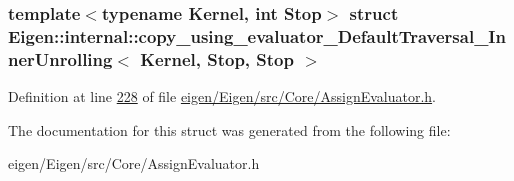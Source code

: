 \subsubsection*{template$<$typename Kernel, int Stop$>$\newline
struct Eigen\+::internal\+::copy\+\_\+using\+\_\+evaluator\+\_\+\+Default\+Traversal\+\_\+\+Inner\+Unrolling$<$ Kernel, Stop, Stop $>$}



Definition at line \hyperlink{eigen_2_eigen_2src_2_core_2_assign_evaluator_8h_source_l00228}{228} of file \hyperlink{eigen_2_eigen_2src_2_core_2_assign_evaluator_8h_source}{eigen/\+Eigen/src/\+Core/\+Assign\+Evaluator.\+h}.



The documentation for this struct was generated from the following file\+:\begin{DoxyCompactItemize}
\item 
eigen/\+Eigen/src/\+Core/\+Assign\+Evaluator.\+h\end{DoxyCompactItemize}
